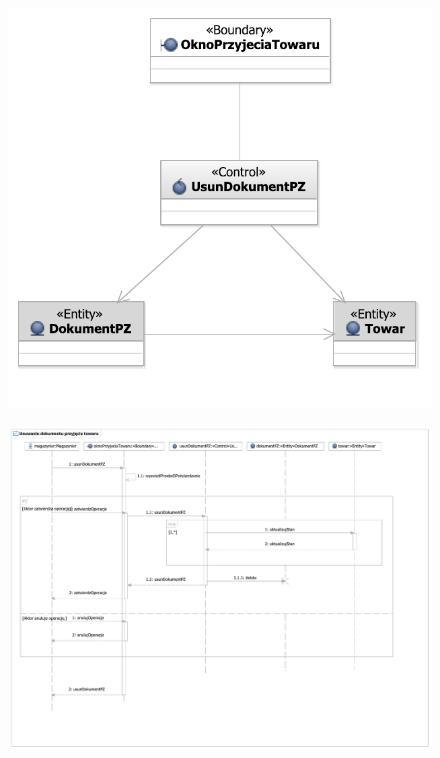\begin{figure}[H]
  \centering
  \includegraphics[angle=\ecbangle, scale=\ecbscale]{../img/usecase/pu26ecb.pdf}
  \caption{}
\end{figure}

\begin{figure}[H]
  \centering
  \includegraphics[angle=\seqangle, scale=0.5]{../img/usecase/pu26seq.pdf}
  \caption{}
\end{figure}
\newpage

